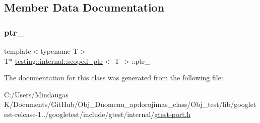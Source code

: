 \subsection{Member Data Documentation}
\mbox{\label{classtesting_1_1internal_1_1scoped__ptr_ab69d9f1f216ae91f8b8abca63e797397}} 
\subsubsection{\texorpdfstring{ptr\_}{ptr\_}}
{\footnotesize\ttfamily template$<$typename T$>$ \\
T$\ast$ \mbox{\hyperlink{classtesting_1_1internal_1_1scoped__ptr}{testing\+::internal\+::scoped\+\_\+ptr}}$<$ T $>$\+::ptr\+\_\+\hspace{0.3cm}{\ttfamily [private]}}



The documentation for this class was generated from the following file\+:\begin{DoxyCompactItemize}
\item 
C\+:/\+Users/\+Mindaugas K/\+Documents/\+Git\+Hub/\+Obj\+\_\+\+Duomenu\+\_\+apdorojimas\+\_\+class/\+Obj\+\_\+test/lib/googletest-\/release-\/1../googletest/include/gtest/internal/\mbox{\hyperlink{_obj__test_2lib_2googletest-release-1_88_81_2googletest_2include_2gtest_2internal_2gtest-port_8h}{gtest-\/port.\+h}}\end{DoxyCompactItemize}
